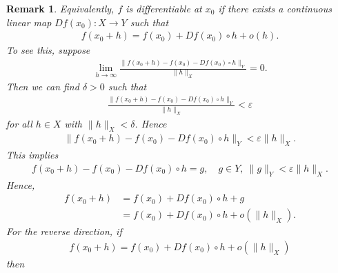 \documentclass[12pt,reqno]{amsart}
\numberwithin{equation}{section}  %
\newcommand{\ee}{\varepsilon}
\newtheorem{remark}[theorem]{Remark}
\begin{document}
\begin{framed}
%
%
\begin{remark}
Equivalently, $f$ is differentiable at $x_{0}$ if there exists a continuous
linear map $Df(x_{0}): X \to Y$ such that
%
%
\begin{equation*}
\begin{split}
f(x_{0} + h) = f(x_{0}) + Df(x_{0}) \circ h + o(h).
\end{split}
\end{equation*}
%
To see this, suppose
%
%
\begin{equation*}
\begin{split}
\lim_{h \to \infty} \frac{\| f(x_{0} + h) - f(x_{0}) - Df(x_{0}) \circ h
\|_{Y}}{\| h \|_{X}} = 0.
\end{split}
\end{equation*}
%
%
Then we can find $\delta > 0$ such that
%
%
\begin{equation*}
\begin{split}
\frac{\| f(x_{0} + h) - f(x_{0}) - Df(x_{0}) \circ h
\|_{Y}}{\| h \|_{X}}  < \ee
\end{split}
\end{equation*}
%
%
for all $h \in X$ with $\| h \|_{X} < \delta$. Hence
%
%
\begin{equation*}
\begin{split}
\| f(x_{0} + h) - f(x_{0}) - Df(x_{0}) \circ h \|_{Y} < \ee \| h
\|_{X}.
\end{split}
\end{equation*}
%
%
This implies
%
%
\begin{equation*}
\begin{split}
f(x_{0} + h) - f(x_{0}) - Df(x_{0}) \circ h = g, \quad g \in Y, \ \| g
\|_{Y} < \ee \| h \|_{X}.
\end{split}
\end{equation*}
%
%
Hence, 
%
%
\begin{equation*}
\begin{split}
f(x_{0} + h) 
& = f(x_{0}) + Df(x_{0}) \circ h + g
\\
& =  f(x_{0}) + Df(x_{0})\circ h + o(\| h \|_{X}).
\end{split}
\end{equation*}
%
%
For the reverse direction, if
%
%
\begin{equation*}
\begin{split}
f(x_{0} + h) = f(x_{0}) + Df(x_{0}) \circ h + o(\| h \|_{X})
\end{split}
\end{equation*}
%
%
then

\end{remark}
\end{framed}
\end{document}
